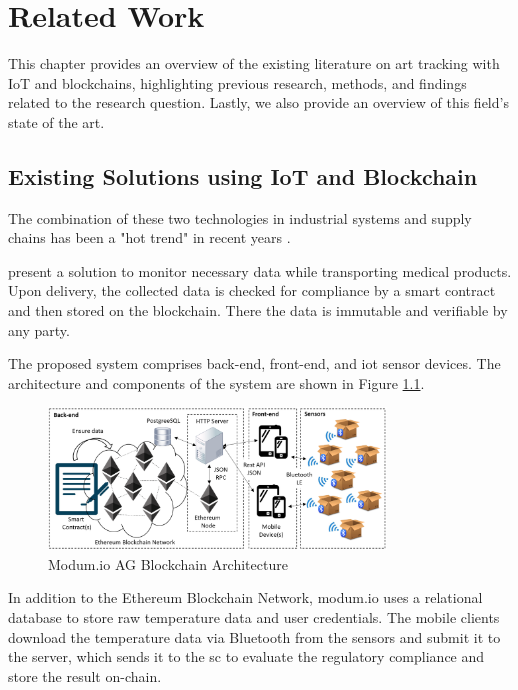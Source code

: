 \chapter{Related Work}
\label{chap:related_work}
This chapter provides an overview of the existing literature on art tracking with IoT and blockchains, highlighting previous research, methods, and findings related to the research question. Lastly, we also provide an overview of this field's state of the art.

\section{Existing Solutions using IoT and Blockchain}
The combination of these two technologies in industrial systems and supply chains has been a "hot trend" in recent years \cite{industryiot}.

\textcite{modum.io} present a solution to monitor necessary data while transporting medical products. Upon delivery, the collected data is checked for compliance by a smart contract and then stored on the blockchain. There the data is immutable and verifiable by any party.

The proposed system comprises back-end, front-end, and \gls{iot} sensor devices. The architecture and components of the system are shown in Figure \ref{fig:modum.io}.

\begin{figure}[ht]
    \centering
    \includegraphics[width=0.8\textwidth]{diagrams/modum_architecutre.png}
    \caption{Modum.io AG Blockchain Architecture \cite{modum.io}}
    \label{fig:modum.io}
\end{figure}

In addition to the Ethereum Blockchain Network, modum.io uses a relational database to store raw temperature data and user credentials. The mobile clients download the temperature data via Bluetooth from the sensors and submit it to the server, which sends it to the \gls{sc} to evaluate the regulatory compliance and store the result \gls{on-chain}.

